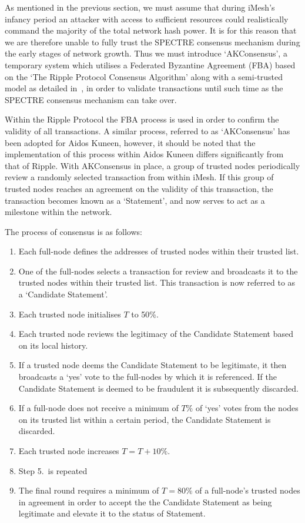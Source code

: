 \documentclass[a4paper,10pt,twocolumn]{article}
\begin{document}
As mentioned in the previous section, we must assume that during iMesh's infancy period an attacker with access to sufficient resources 
could realistically command the majority of the total network hash power. It is for this reason that we are therefore unable to fully 
trust the SPECTRE consensus mechanism during the early stages of network growth. Thus we must introduce `AKConsensus',
a temporary system which utilises a Federated Byzantine Agreement (FBA) based on the `The Ripple Protocol Consensus Algorithm' 
along with a semi-trusted model as detailed in~\cite{ripple}, in order to validate transactions until such time as the SPECTRE consensus mechanism can take over.

Within the Ripple Protocol the FBA process is used in order to confirm the validity of all transactions.
A similar process, referred to as `AKConsensus' has been adopted for Aidos Kuneen, however, it should be noted that the implementation 
of this process within Aidos Kuneen differs significantly from that of Ripple. 
With AKConsensus in place, a group of trusted nodes periodically review a randomly selected transaction from within iMesh.
If this group of trusted nodes reaches an agreement on the validity of this transaction, the transaction becomes known as a `Statement', and now serves to act as a milestone within the network.

The process of consensus is as follows:

\vspace{-0.5\baselineskip}
\begin{enumerate}
	\setlength\itemsep{0em}
	\item Each full-node defines the addresses of trusted nodes within their trusted list.
	\item One of the full-nodes selects a transaction for review and broadcasts it to the trusted nodes within their trusted list. 		This transaction is now referred to as a `Candidate Statement'.
	\item Each trusted node initialises \(T\) to 50\%.
	\item Each trusted node reviews the legitimacy of the Candidate Statement based on its local history.
	\item If a trusted node deems the Candidate Statement to be legitimate, it then broadcasts a `yes' vote to the full-nodes by which it is referenced. If the Candidate Statement is deemed to be fraudulent it is subsequently discarded.
	\item If a full-node does not receive a minimum of \(T\%\) of `yes' votes from the nodes on its trusted list within a certain period, the Candidate Statement is discarded.
	\item Each trusted node increases \(T=T+10\%\).
	\item Step 5.\ is repeated
	\item The final round requires a minimum of \(T=80\%\) of a full-node's trusted nodes in agreement in order to accept the the Candidate Statement as being legitimate and elevate it to the status of Statement.
\end{enumerate}
\end{document}
